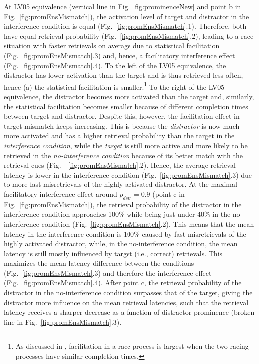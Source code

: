 \documentclass{cambridge7A}\usepackage[]{graphicx}\usepackage[]{color}
\begin{document}
At LV05 equivalence (vertical line in Fig.~\ref{fig:prominenceNew} and point b in Fig.~\ref{fig:promEnsMismatch}), the activation level of target and distractor in the interference condition is equal (Fig.~\ref{fig:promEnsMismatch}.1). Therefore, both have equal retrieval probability (Fig.~\ref{fig:promEnsMismatch}.2), leading to a race situation with  faster retrievals on average due to statistical facilitation (Fig.~\ref{fig:promEnsMismatch}.3) and, hence, a facilitatory interference effect (Fig.~\ref{fig:promEnsMismatch}.4).
To the left of the LV05 equivalence, the distractor has lower activation than the target and is thus retrieved less often, hence (a) the statistical facilitation is smaller.\footnote{
  As discussed in \cite{LogacevVasishth2015}, facilitation in a race process is largest when the two racing processes have similar completion times.} 
To the right of the LV05 equivalence, the distractor becomes more activated than the target and, similarly, the statistical facilitation becomes smaller because of different completion times between target and distractor. Despite this, however, the facilitation effect in target-mismatch keeps increasing. This is because the \emph{distractor} is now much more activated and has a higher retrieval probability than the target in the  \emph{interference condition}, while the \emph{target} is still more active and more likely to be retrieved in the  \emph{no-interference condition} because of its better match with the retrieval cues (Fig.~~\ref{fig:promEnsMismatch}.2). Hence, the average retrieval latency is lower in the interference condition (Fig.~\ref{fig:promEnsMismatch}.3) due to more fast  misretrievals of the highly activated distractor. 
At the maximal facilitatory interference effect around $p_{dstr}=0.9$ (point c in Fig.~\ref{fig:promEnsMismatch}), the retrieval probability of the distractor in the interference condition approaches 100\% while being just under 40\% in the no-interference condition (Fig.~\ref{fig:promEnsMismatch}.2). 
This means that the mean latency in the interference condition is 100\% caused by fast misretrievals of the highly activated distractor, while, in the no-interference condition, the mean latency is still mostly influenced by target (i.e., correct) retrievals.
This maximizes the mean latency difference between the conditions (Fig.~\ref{fig:promEnsMismatch}.3) and therefore the interference effect (Fig.~\ref{fig:promEnsMismatch}.4). 
After point c, the retrieval probability of the distractor in the no-interference condition surpasses that of the target, giving the distractor more influence on the mean retrieval latencies, such that the retrieval latency receives a sharper decrease as a function of distractor prominence (broken line in Fig.~\ref{fig:promEnsMismatch}.3).
\end{document}
